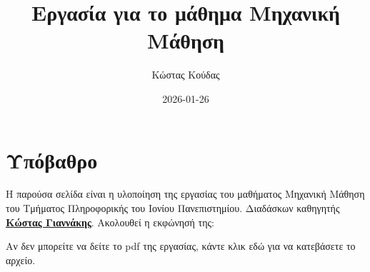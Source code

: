 \documentclass[
]{article}
\title{Εργασία για το μάθημα Μηχανική Μάθηση}
\author{Κώστας Κούδας}
\date{2026-01-26}
\newenvironment{Shaded}{\begin{snugshade}}{\end{snugshade}}
\newcommand{\AttributeTok}[1]{\textcolor[rgb]{0.13,0.29,0.53}{#1}}
\newcommand{\CommentTok}[1]{\textcolor[rgb]{0.56,0.35,0.01}{\textit{#1}}}
\newcommand{\ConstantTok}[1]{\textcolor[rgb]{0.56,0.35,0.01}{#1}}
\newcommand{\ControlFlowTok}[1]{\textcolor[rgb]{0.13,0.29,0.53}{\textbf{#1}}}
\newcommand{\FunctionTok}[1]{\textcolor[rgb]{0.13,0.29,0.53}{\textbf{#1}}}
\newcommand{\NormalTok}[1]{#1}
\newcommand{\SpecialCharTok}[1]{\textcolor[rgb]{0.81,0.36,0.00}{\textbf{#1}}}
\newcommand{\StringTok}[1]{\textcolor[rgb]{0.31,0.60,0.02}{#1}}
\begin{document}
\maketitle

{
\setcounter{tocdepth}{2}
\tableofcontents
}
\section{Υπόβαθρο}\label{ux3c5ux3c0ux3ccux3b2ux3b1ux3b8ux3c1ux3bf}

\begin{Shaded}
\end{Shaded}

Η παρούσα σελίδα είναι η υλοποίηση της εργασίας του μαθήματος Μηχανική
Μάθηση του Τμήματος Πληροφορικής του Ιονίου Πανεπιστημίου. Διαδάσκων
καθηγητής
\href{https://di.ionio.gr/gr/department/staff/1072-giannakis/}{\textbf{Κώστας
Γιαννάκης}}. Ακολουθεί η εκφώνησή της:

Αν δεν μπορείτε να δείτε το pdf της εργασίας, κάντε κλικ εδώ για να
κατεβάσετε το αρχείο.
\end{document}
